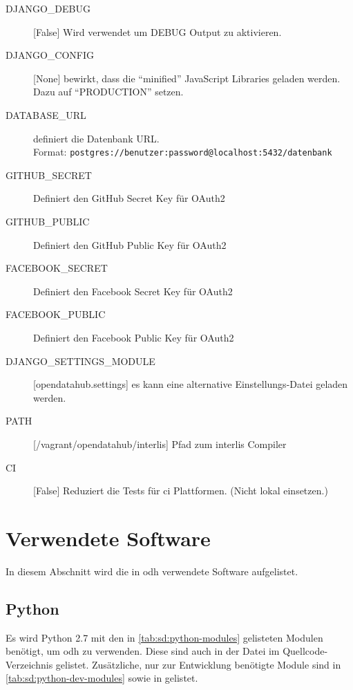 \begin{description}
\item[DJANGO\_DEBUG]{[}False{]} Wird verwendet um DEBUG Output zu aktivieren. 
\item[DJANGO\_CONFIG]{[}None{]} bewirkt, dass die ``minified'' JavaScript Libraries geladen werden. Dazu auf ``PRODUCTION'' setzen.
\item[DATABASE\_URL] definiert die Datenbank URL. \\Format: \texttt{postgres://benutzer:password@localhost:5432/datenbank}
\item[GITHUB\_SECRET] Definiert den GitHub Secret Key für OAuth2
\item[GITHUB\_PUBLIC] Definiert den GitHub Public Key für OAuth2
\item[FACEBOOK\_SECRET] Definiert den Facebook Secret Key für OAuth2
\item[FACEBOOK\_PUBLIC] Definiert den Facebook Public Key für OAuth2
\item[DJANGO\_SETTINGS\_MODULE]{[}opendatahub.settings{]} es kann eine alternative Einstellungs-Datei geladen werden.
\item[PATH]{[}/vagrant/opendatahub/interlis{]} Pfad zum \gls{interlis} Compiler
\item[CI]{[}False{]} Reduziert die Tests für \acl{ci} Plattformen. (Nicht lokal einsetzen.)
\end{description}

\section{Verwendete Software}
In diesem Abschnitt wird die in \acl{odh} verwendete Software aufgelistet.

\subsection{Python}
Es wird Python 2.7 mit den in \cref{tab:sd:python-modules} gelisteten Modulen benötigt, um \acl{odh} zu verwenden. Diese sind auch in der Datei  im Quellcode-Verzeichnis gelistet. Zusätzliche, nur zur Entwicklung benötigte Module sind in \cref{tab:sd:python-dev-modules} sowie in  gelistet.

